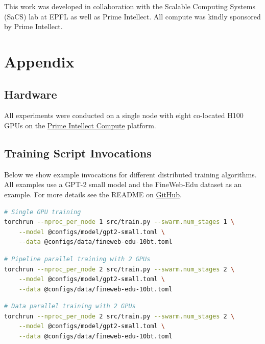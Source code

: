 \documentclass{article}
\newcommand{\github}{\href{https://github.com/mikasenghaas/swarm}{GitHub}}
\begin{document}
This work was developed in collaboration with the Scalable Computing Systems
(SaCS) lab at EPFL as well as Prime Intellect. All compute was kindly sponsored
by Prime Intellect.




\newpage
\appendix
\onecolumn

\section{Appendix}


\subsection{Hardware}

All experiments were conducted on a single node with eight co-located H100 GPUs
on the \href{https://app.primeintellect.com/}{Prime Intellect Compute} platform.

\subsection{Training Script Invocations}

Below we show example invocations for different distributed training algorithms.
All examples use a GPT-2 small model and the FineWeb-Edu dataset as an example.
For more details see the README on \github.

\begin{lstlisting}[language=bash]
# Single GPU training
torchrun --nproc_per_node 1 src/train.py --swarm.num_stages 1 \
    --model @configs/model/gpt2-small.toml \
    --data @configs/data/fineweb-edu-10bt.toml
\end{lstlisting}

\begin{lstlisting}[language=bash]
# Pipeline parallel training with 2 GPUs
torchrun --nproc_per_node 2 src/train.py --swarm.num_stages 2 \
    --model @configs/model/gpt2-small.toml \
    --data @configs/data/fineweb-edu-10bt.toml
\end{lstlisting}

\begin{lstlisting}[language=bash]
# Data parallel training with 2 GPUs
torchrun --nproc_per_node 2 src/train.py --swarm.num_stages 2 \
    --model @configs/model/gpt2-small.toml \
    --data @configs/data/fineweb-edu-10bt.toml
\end{lstlisting}
\end{document}
